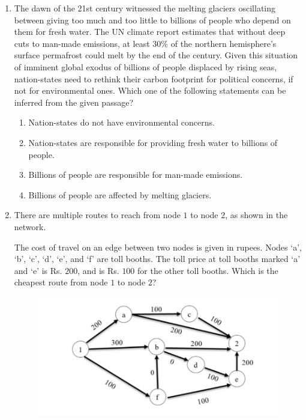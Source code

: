 \documentclass[journal,12pt,onecolumn]{IEEEtran}
\theoremstyle{remark}
\begin{document}
\begin{enumerate}
		\item The dawn of the 21st century witnessed the melting glaciers oscillating between giving too much and too little to billions of people who depend on them for fresh water. The UN climate report estimates that without deep cuts to man-made emissions, at least $30\%$ of the northern hemisphere’s surface permafrost could melt by the end of the century. Given this situation of imminent global exodus of billions of people displaced by rising seas, nation-states need to rethink their carbon footprint for political concerns, if not for environmental ones.
		Which one of the following statements can be inferred from the given passage?
		
		\hfill{}
		\begin{enumerate}
			\item Nation-states do not have environmental concerns.
			\item Nation-states are responsible for providing fresh water to billions of people.
			\item Billions of people are responsible for man-made emissions.
			\item Billions of people are affected by melting glaciers.
		\end{enumerate}
		
		\item There are multiple routes to reach from node $1$ to node $2$, as shown in the network.
	
		The cost of travel on an edge between two nodes is given in rupees. Nodes `a', `b', `c', `d', `e', and `f' are toll booths. The toll price at toll booths marked `a' and `e' is Rs. $200$, and is Rs. $100$ for the other toll booths. Which is the cheapest route from node $1$ to node $2$?
		\begin{figure}[H]
			\centering
			\includegraphics[width=0.6\linewidth]{figs/1}
			\caption{}
			\label{fig:1}
		\end{figure}
		

\end{enumerate}
\end{document}
